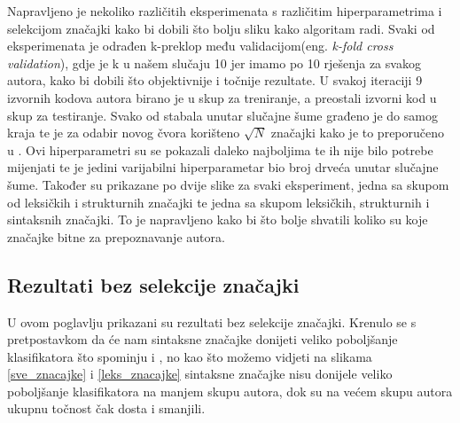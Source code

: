 Napravljeno je nekoliko različitih eksperimenata s različitim hiperparametrima i selekcijom značajki kako bi dobili što bolju sliku kako algoritam radi. Svaki od eksperimenata je odrađen k-preklop među validacijom(eng. \textit{k-fold cross validation}), gdje je k u našem slučaju 10 jer imamo po 10 rješenja za svakog autora, kako bi dobili što objektivnije i točnije rezultate. U svakoj iteraciji 9 izvornih kodova autora birano je u skup za treniranje, a preostali izvorni kod u skup za testiranje. Svako od stabala unutar slučajne šume građeno je do samog kraja te je za odabir novog čvora korišteno $\sqrt{N}$ značajki kako je to preporučeno u \cite{statisticallearning}. Ovi hiperparametri su se pokazali daleko najboljima te ih nije bilo potrebe mijenjati te je jedini varijabilni hiperparametar bio broj drveća unutar slučajne šume. Također su prikazane po dvije slike za svaki eksperiment, jedna sa skupom od leksičkih i strukturnih značajki te jedna sa skupom leksičkih, strukturnih i sintaksnih značajki. To je napravljeno kako bi što bolje shvatili koliko su koje značajke bitne za prepoznavanje autora.

\subsection{Rezultati bez selekcije značajki}

U ovom poglavlju prikazani su  rezultati bez selekcije značajki. Krenulo se s pretpostavkom da će nam sintaksne značajke donijeti veliko poboljšanje klasifikatora što spominju i \cite{islam}, no kao što možemo vidjeti na slikama \ref{sve_znacajke} i \ref{leks_znacajke} sintaksne značajke nisu donijele veliko poboljšanje klasifikatora na manjem skupu autora, dok su na većem skupu autora ukupnu točnost čak dosta i smanjili. 

